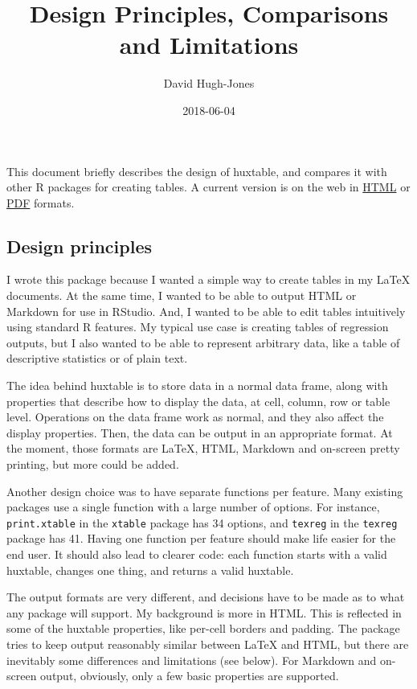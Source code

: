 \documentclass[]{article}
\title{Design Principles, Comparisons and Limitations}
\author{David Hugh-Jones}
\date{2018-06-04}
\begin{document}
\maketitle

This document briefly describes the design of huxtable, and compares it
with other R packages for creating tables. A current version is on the
web in
\href{http://hughjonesd.github.io/huxtable/design-principles.html}{HTML}
or
\href{http://hughjonesd.github.io/huxtable/design-principles.pdf}{PDF}
formats.

\subsection{Design principles}\label{design-principles}

I wrote this package because I wanted a simple way to create tables in
my LaTeX documents. At the same time, I wanted to be able to output HTML
or Markdown for use in RStudio. And, I wanted to be able to edit tables
intuitively using standard R features. My typical use case is creating
tables of regression outputs, but I also wanted to be able to represent
arbitrary data, like a table of descriptive statistics or of plain text.

The idea behind huxtable is to store data in a normal data frame, along
with properties that describe how to display the data, at cell, column,
row or table level. Operations on the data frame work as normal, and
they also affect the display properties. Then, the data can be output in
an appropriate format. At the moment, those formats are LaTeX, HTML,
Markdown and on-screen pretty printing, but more could be added.

Another design choice was to have separate functions per feature. Many
existing packages use a single function with a large number of options.
For instance, \texttt{print.xtable} in the \texttt{xtable} package has
34 options, and \texttt{texreg} in the \texttt{texreg} package has 41.
Having one function per feature should make life easier for the end
user. It should also lead to clearer code: each function starts with a
valid huxtable, changes one thing, and returns a valid huxtable.

The output formats are very different, and decisions have to be made as
to what any package will support. My background is more in HTML. This is
reflected in some of the huxtable properties, like per-cell borders and
padding. The package tries to keep output reasonably similar between
LaTeX and HTML, but there are inevitably some differences and
limitations (see below). For Markdown and on-screen output, obviously,
only a few basic properties are supported.
\end{document}
